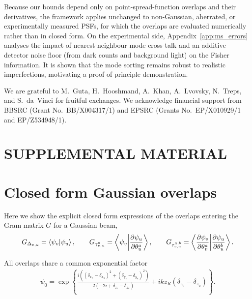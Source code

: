 \documentclass[reprint,amsmath,amssymb,aps,prl,floatfix,groupedaddress,superscriptaddress]{revtex4-2}
\begin{document}
{\color{red} Because our bounds depend only on point-spread-function overlaps and their derivatives, the framework applies unchanged to non-Gaussian, aberrated, or experimentally measured PSFs, for which the overlaps are evaluated numerically rather than in closed form. On the experimental side, Appendix~\ref{app:ms_errors} analyses the impact of nearest-neighbour mode cross-talk and an additive detector noise floor (from dark counts and background light) on the Fisher information. It is shown that the mode sorting remains robust to realistic imperfections, motivating a proof-of-principle demonstration.}



\begin{acknowledgments}

We are grateful to M.~Guta, H.~Hooshmand, A.~Khan, A.~Lvovsky, N.~Treps, and S.~da~Vinci for fruitful exchanges.
We acknowledge financial support from BBSRC (Grant No.~BB/X004317/1) and EPSRC (Grants No.~EP/X010929/1 and EP/Z534948/1).
\end{acknowledgments}

%


\clearpage
\appendix
\onecolumngrid
\setcounter{secnumdepth}{2}
\setcounter{figure}{0}
\renewcommand{\thefigure}{S\arabic{figure}}


\section*{SUPPLEMENTAL MATERIAL}

\section{Closed form Gaussian overlaps\label{app:gaussian_overlaps}}
Here we show the explicit closed form expressions of the overlaps entering the Gram matrix $G$ for a Gaussian beam,
\begin{equation}
    G_{\Delta_{v,u}} = \braket{\psi_v}{\psi_u}, \qquad    G_{\gamma^{a}_{v,u}} = \braket{\psi_v}{ \frac{\partial \psi_u}{\partial \theta_u^a}}, \qquad G_{\tau^{a,b}_{v,u}} = \braket{\frac{\partial \psi_v}{\partial \theta_v^a}}{ \frac{\partial \psi_u}{\partial \theta_u^b}}.
    \label{eq:Grammian}
\end{equation}

All overlaps share a common exponential factor
\begin{align}
    \psi_0 = \exp \left \{ \frac{i \left ( (\delta_{x_v} - \delta_{x_u})^2 + (\delta_{y_v} - \delta_{y_u})^2 \right )}{2(-2i + \delta_{z_v} - \delta_{z_u})} + i k z_R (\delta_{z_v} - \delta_{z_u}) \right \}.
\end{align}
\end{document}
